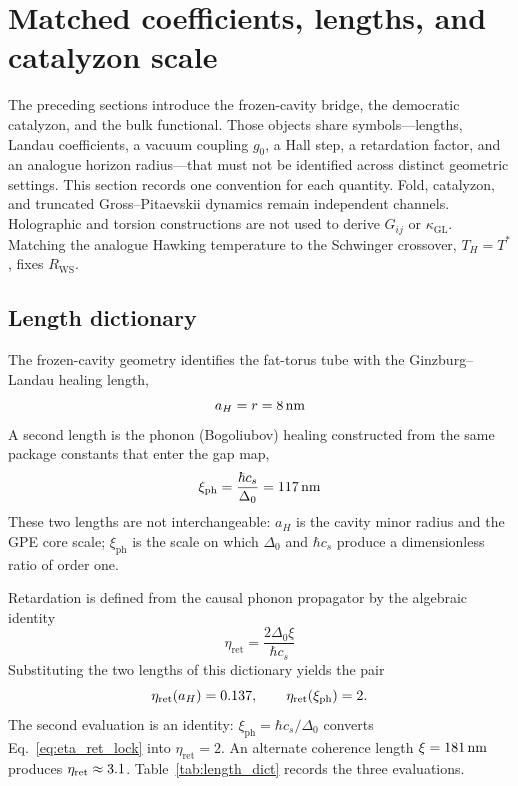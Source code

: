 \section{Matched coefficients, lengths, and catalyzon scale}
\label{sec:l1_dictionary}

The preceding sections introduce the frozen-cavity bridge, the democratic catalyzon, and the bulk \TQGL{} functional. Those objects share symbols---lengths, Landau coefficients, a vacuum coupling $g_0$, a Hall step, a retardation factor, and an analogue horizon radius---that must not be identified across distinct geometric settings. This section records one convention for each quantity. Fold, catalyzon, and truncated Gross--Pitaevskii dynamics remain independent channels. Holographic and torsion constructions are not used to derive $G_{ij}$ or $\kappa_{\mathrm{GL}}$. Matching the analogue Hawking temperature to the Schwinger crossover, $T_H=T^*$, fixes $R_{\mathrm{WS}}$.

\subsection{Length dictionary}
\label{sec:length_dict}

The frozen-cavity geometry identifies the fat-torus tube with the Ginzburg--Landau healing length,
\begin{equation}
a_H = r = 8\,\mathrm{nm}
\end{equation}
A second length is the phonon (Bogoliubov) healing constructed from the same package constants that enter the gap map,
\begin{equation}
\xi_{\mathrm{ph}} = \frac{\hbar c_s}{\Delta_0} = 117\,\mathrm{nm}
\end{equation}
These two lengths are not interchangeable: $a_H$ is the cavity minor radius and the GPE core scale; $\xi_{\mathrm{ph}}$ is the scale on which $\Delta_0$ and $\hbar c_s$ produce a dimensionless ratio of order one.

Retardation is defined from the causal phonon propagator by the algebraic identity
\begin{equation}
\eta_{\mathrm{ret}} = \frac{2\Delta_0\xi}{\hbar c_s}
\label{eq:eta_ret_lock}
\end{equation}
Substituting the two lengths of this dictionary yields the pair
\begin{equation}
\eta_{\mathrm{ret}}(a_H)=0.137,\qquad
\eta_{\mathrm{ret}}(\xi_{\mathrm{ph}})=2.
\end{equation}
The second evaluation is an identity: $\xi_{\mathrm{ph}}=\hbar c_s/\Delta_0$ converts Eq.~\eqref{eq:eta_ret_lock} into $\eta_{\mathrm{ret}}=2$. An alternate coherence length $\xi=181\,\mathrm{nm}$ produces $\eta_{\mathrm{ret}}\approx3.1$. Table~\ref{tab:length_dict} records the three evaluations.

